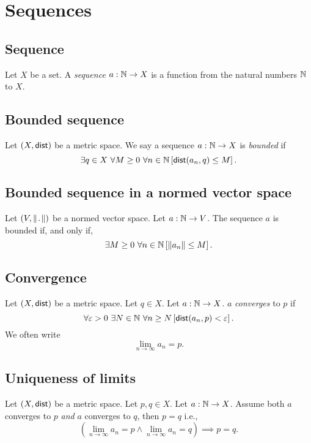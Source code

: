 \section{Sequences}


\subsection{Sequence}
\udef Let $X$ be a set. A \emph{sequence} $a : \mathbb{N} \to X$ is a function
from the natural numbers $\mathbb{N}$ to $X$.


\subsection{Bounded sequence}
\udef Let $(X, \mathsf{dist})$ be a metric space.
We say a sequence $a : \mathbb{N} \to X$ is \emph{bounded} if
\[
    \exists q \in X\ \forall M \geq 0\ \forall n \in \N \left[ 
    \dist(a_n, q) \leq M \right].
\]


\subsection{Bounded sequence in a normed vector space}
\udef Let $(V, \norm)$ be a normed vector space.
Let $a : \mathbb{N} \to V$. The sequence $a$ is bounded if, and only if,
\[
    \exists M \geq 0\ \forall n \in \mathbb{N} \left[ \| a_n \| \leq M \right].
\]


\subsection{Convergence}
Let $(X, \mathsf{dist})$ be a metric space. Let $q \in X$. Let $a : \mathbb{N} \to X$.
$a$ \emph{converges} to $p$ if
\[
    \forall \varepsilon > 0\ \exists N \in \mathbb{N}\ \forall n \geq N \left[
    \mathsf{dist}(a_n,p) < \varepsilon \right].
\]
We often write
\[
    \lim_{n \to \infty}a_n = p.
\]


\subsection{Uniqueness of limits}
Let $(X, \mathsf{dist})$ be a metric space. Let $p,q \in X$. Let $a : \mathbb{N} \to X$.
Assume both $a$ converges to $p$ \emph{and} $a$ converges to $q$, then $p = q$ i.e.,
\[
    \left( \lim_{n \to \infty} a_n = p \land \lim_{n \to \infty} a_n = q \right)
    \implies p = q.
\]


